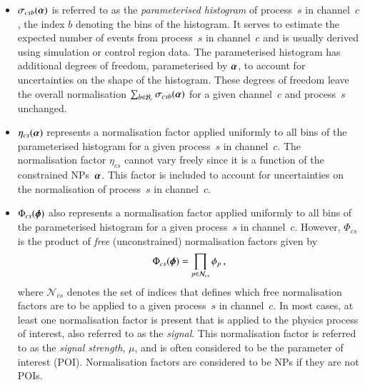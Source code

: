 \begin{itemize}

\item $\sigma_{csb}(\myvec{\alpha})$ is referred to as the \emph{parameterised
    histogram} of process~$s$ in channel~$c$, the index $b$ denoting the bins of
  the histogram. It serves to estimate the expected number of events from
  process~$s$ in channel~$c$ and is usually derived using simulation or control
  region data. The parameterised histogram has additional degrees of freedom,
  parameterised by $\myvec{\alpha}$, to account for uncertainties on the shape
  of the histogram. These degrees of freedom leave the overall normalisation
  $\sum_{b \in \mathcal{B}_{c}} \sigma_{csb}(\myvec{\alpha})$ for a given
  channel~$c$ and process~$s$ unchanged.

\item $\eta_{cs}(\myvec{\alpha})$ represents a normalisation factor applied
  uniformly to all bins of the parameterised histogram for a given process~$s$
  in channel~$c$. The normalisation factor $\eta_{cs}$ cannot vary freely since
  it is a function of the constrained NPs~$\myvec{\alpha}$. This factor is
  included to account for uncertainties on the normalisation of process~$s$ in
  channel~$c$.

\item $\Phi_{cs}(\myvec{\phi})$ also represents a normalisation factor applied
  uniformly to all bins of the parameterised histogram for a given process~$s$
  in channel~$c$. However, $\Phi_{cs}$ is the product of \emph{free}
  (unconstrained) normalisation factors given by
  \begin{align*}
    \Phi_{cs}(\myvec{\phi}) = \prod_{p \in \mathcal{N}_{cs}} \phi_p \,\text{,}
  \end{align*}
  where $\mathcal{N}_{cs}$ denotes the set of indices that defines which free
  normalisation factors are to be applied to a given process~$s$ in channel~$c$.
  In most cases, at least one normalisation factor is present that is applied to
  the physics process of interest, also referred to as the \emph{signal}. This
  normalisation factor is referred to as the \emph{signal strength}, $\mu$, and
  is often considered to be the parameter of interest (POI). Normalisation
  factors are considered to be NPs if they are not POIs.


\end{itemize}
